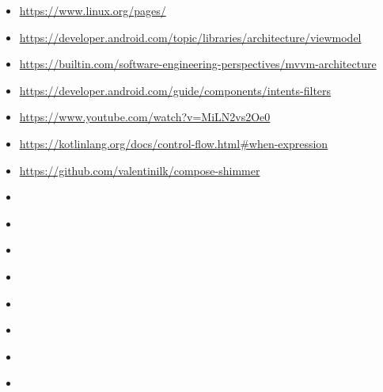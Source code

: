 \begin{itemize}
  \item \url{https://www.linux.org/pages/}
  \item \url{https://developer.android.com/topic/libraries/architecture/viewmodel}
  \item \url{https://builtin.com/software-engineering-perspectives/mvvm-architecture}
  \item \url{https://developer.android.com/guide/components/intents-filters}
  \item \url{https://www.youtube.com/watch?v=MiLN2vs2Oe0}
  \item \url{https://kotlinlang.org/docs/control-flow.html#when-expression}
  \item \url{https://github.com/valentinilk/compose-shimmer}
  \item \url{}
  \item \url{}
  \item \url{}
  \item \url{}
  \item \url{}
  \item \url{}
  \item \url{}
  \item \url{}
\end{itemize}

\makeBib


